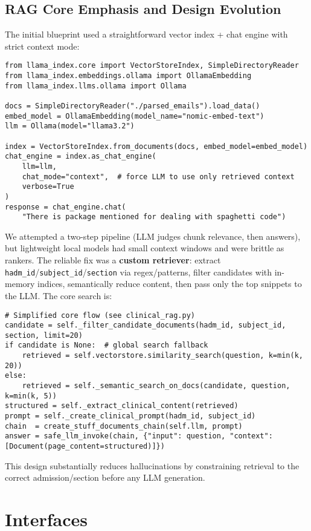 \subsection{RAG Core Emphasis and Design Evolution}
The initial blueprint used a straightforward vector index + chat engine with strict context mode:
\begin{verbatim}
from llama_index.core import VectorStoreIndex, SimpleDirectoryReader
from llama_index.embeddings.ollama import OllamaEmbedding
from llama_index.llms.ollama import Ollama

docs = SimpleDirectoryReader("./parsed_emails").load_data()
embed_model = OllamaEmbedding(model_name="nomic-embed-text")
llm = Ollama(model="llama3.2")

index = VectorStoreIndex.from_documents(docs, embed_model=embed_model)
chat_engine = index.as_chat_engine(
    llm=llm,
    chat_mode="context",  # force LLM to use only retrieved context
    verbose=True
)
response = chat_engine.chat(
    "There is package mentioned for dealing with spaghetti code")
\end{verbatim}

We attempted a two-step pipeline (LLM judges chunk relevance, then answers), but lightweight local models had small context windows and were brittle as rankers. The reliable fix was a \textbf{custom retriever}: extract \texttt{hadm\_id}/\texttt{subject\_id}/\texttt{section} via regex/patterns, filter candidates with in-memory indices, semantically reduce content, then pass only the top snippets to the LLM. The core search is:
\begin{verbatim}
# Simplified core flow (see clinical_rag.py)
candidate = self._filter_candidate_documents(hadm_id, subject_id, section, limit=20)
if candidate is None:  # global search fallback
    retrieved = self.vectorstore.similarity_search(question, k=min(k, 20))
else:
    retrieved = self._semantic_search_on_docs(candidate, question, k=min(k, 5))
structured = self._extract_clinical_content(retrieved)
prompt = self._create_clinical_prompt(hadm_id, subject_id)
chain  = create_stuff_documents_chain(self.llm, prompt)
answer = safe_llm_invoke(chain, {"input": question, "context": [Document(page_content=structured)]})
\end{verbatim}
This design substantially reduces hallucinations by constraining retrieval to the correct admission/section before any LLM generation.

\section{Interfaces}
